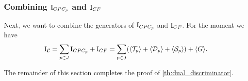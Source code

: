 \documentclass[11pt]{article}
\newcommand{\Cc}{\mathcal{C}}
\newcommand{\I}{\emph{$\rm{I}$}}
\newcommand{\1}{\textbf{1}}
\begin{document}
\subsubsection[Combining I(CPCp) and I(CF)]{Combining $\I_{CPC_p}$ and $\I_{CF}$}\label{sect:combin_gen}

Next, we want to combine the generators of $\I_{CPC_p}$ and $\I_{CF}$. For the moment we have
\begin{equation}\label{eqn:combinatorial_ideal_decomposition_1}
    \I_{\Cc} = \sum_{p \in J} \I_{CPC_p} + \I_{CF} = \sum_{p \in J} (\langle \mathcal{T}_p \rangle + \langle \mathcal{D}_p \rangle + \langle \mathcal{S}_p \rangle) + \langle G \rangle.
\end{equation}

The remainder of this section completes the proof of \cref{th:dual_discriminator}.
\end{document}
